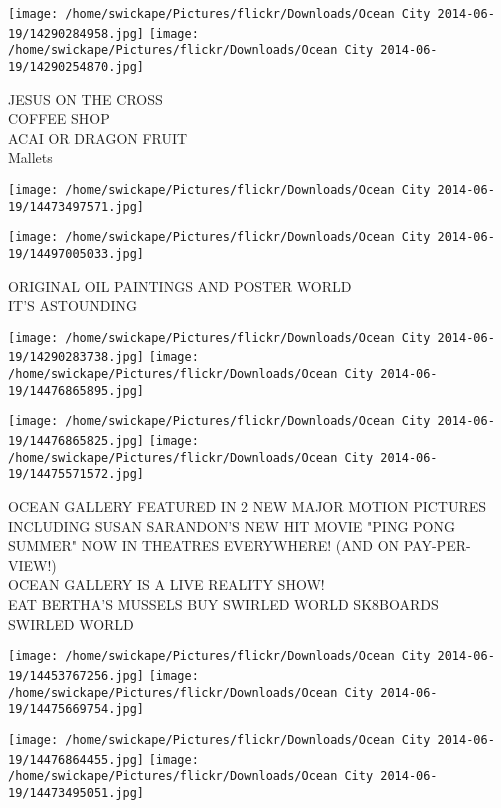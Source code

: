 \documentclass[10pt,letterpaper]{article}
\begin{document}
\texttt{[image: /home/swickape/Pictures/flickr/Downloads/Ocean City 2014-06-19/14290284958.jpg]}
\texttt{[image: /home/swickape/Pictures/flickr/Downloads/Ocean City 2014-06-19/14290254870.jpg]}

JESUS ON THE CROSS\\
COFFEE SHOP\\
ACAI OR DRAGON FRUIT\\
Mallets\\
\pagebreak

\texttt{[image: /home/swickape/Pictures/flickr/Downloads/Ocean City 2014-06-19/14473497571.jpg]}

\vspace{0.25in}
\texttt{[image: /home/swickape/Pictures/flickr/Downloads/Ocean City 2014-06-19/14497005033.jpg]}

ORIGINAL OIL PAINTINGS AND POSTER WORLD\\
IT'S ASTOUNDING\\
\pagebreak

\texttt{[image: /home/swickape/Pictures/flickr/Downloads/Ocean City 2014-06-19/14290283738.jpg]}
\texttt{[image: /home/swickape/Pictures/flickr/Downloads/Ocean City 2014-06-19/14476865895.jpg]}

\texttt{[image: /home/swickape/Pictures/flickr/Downloads/Ocean City 2014-06-19/14476865825.jpg]}
\texttt{[image: /home/swickape/Pictures/flickr/Downloads/Ocean City 2014-06-19/14475571572.jpg]}

OCEAN GALLERY FEATURED IN 2 NEW MAJOR MOTION PICTURES INCLUDING SUSAN SARANDON'S NEW HIT MOVIE "PING PONG SUMMER" NOW IN THEATRES EVERYWHERE!  (AND ON PAY{-}PER{-}VIEW!)\\
OCEAN GALLERY IS A LIVE REALITY SHOW!\\
EAT BERTHA'S MUSSELS BUY SWIRLED WORLD SK8BOARDS\\
SWIRLED WORLD\\
\pagebreak

\texttt{[image: /home/swickape/Pictures/flickr/Downloads/Ocean City 2014-06-19/14453767256.jpg]}
\texttt{[image: /home/swickape/Pictures/flickr/Downloads/Ocean City 2014-06-19/14475669754.jpg]}

\texttt{[image: /home/swickape/Pictures/flickr/Downloads/Ocean City 2014-06-19/14476864455.jpg]}
\texttt{[image: /home/swickape/Pictures/flickr/Downloads/Ocean City 2014-06-19/14473495051.jpg]}
\end{document}
